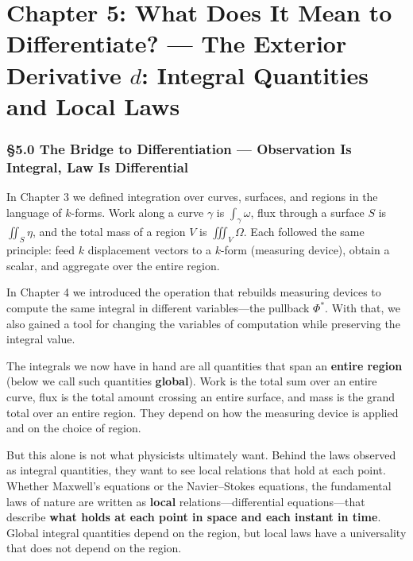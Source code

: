 \newpage

\hypertarget{chapter-5-what-does-it-mean-to-differentiate-the-exterior-derivative-d-integral-quantities-and-local-laws}{%
\chapter{\texorpdfstring{Chapter 5: What Does It Mean to Differentiate?
--- The Exterior Derivative \(d\): Integral Quantities and Local
Laws}{Chapter 5: What Does It Mean to Differentiate? --- The Exterior Derivative d: Integral Quantities and Local Laws}}\label{chapter-5-what-does-it-mean-to-differentiate-the-exterior-derivative-d-integral-quantities-and-local-laws}}

\hypertarget{the-bridge-to-differentiation-observation-is-integral-law-is-differential}{%
\subsection{§5.0 The Bridge to Differentiation --- Observation Is
Integral, Law Is
Differential}\label{the-bridge-to-differentiation-observation-is-integral-law-is-differential}}

In Chapter 3 we defined integration over curves, surfaces, and regions
in the language of \(k\)-forms. Work along a curve \(\gamma\) is
\(\int_\gamma \omega\), flux through a surface \(S\) is
\(\iint_S \eta\), and the total mass of a region \(V\) is
\(\iiint_V \Omega\). Each followed the same principle: feed \(k\)
displacement vectors to a \(k\)-form (measuring device), obtain a
scalar, and aggregate over the entire region.

In Chapter 4 we introduced the operation that rebuilds measuring devices
to compute the same integral in different variables---the pullback
\(\Phi^*\). With that, we also gained a tool for changing the variables
of computation while preserving the integral value.

The integrals we now have in hand are all quantities that span an
\textbf{entire region} (below we call such quantities \textbf{global}).
Work is the total sum over an entire curve, flux is the total amount
crossing an entire surface, and mass is the grand total over an entire
region. They depend on how the measuring device is applied and on the
choice of region.

But this alone is not what physicists ultimately want. Behind the laws
observed as integral quantities, they want to see local relations that
hold at each point. Whether Maxwell's equations or the Navier--Stokes
equations, the fundamental laws of nature are written as \textbf{local}
relations---differential equations---that describe
\textbf{what holds at each point in space and each instant in time}.
Global integral quantities depend on the region, but local laws have a
universality that does not depend on the region.

